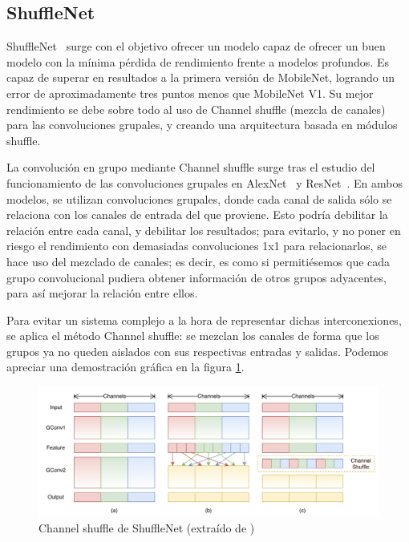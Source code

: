 \subsection{ShuffleNet}

ShuffleNet~\cite{zhang2017shufflenet,shufflenetreview} surge con el objetivo ofrecer un modelo capaz de ofrecer un buen modelo con la mínima pérdida de rendimiento frente a modelos profundos. Es capaz de superar en resultados a la primera versión de MobileNet, logrando un error de aproximadamente tres puntos menos que MobileNet V1. Su mejor rendimiento se debe sobre todo al uso de Channel shuffle (mezcla de canales) para las convoluciones grupales, y creando una arquitectura basada en módulos shuffle.

La convolución en grupo mediante Channel shuffle surge tras el estudio del funcionamiento de las convoluciones grupales en 	AlexNet~\cite{NIPS2012_c399862d} y ResNet~\cite{he2015deep}. En ambos modelos, se utilizan convoluciones grupales, donde cada canal de salida sólo se relaciona con los canales de entrada del que proviene. Esto podría debilitar la relación entre cada canal, y debilitar los resultados; para evitarlo, y no poner en riesgo el rendimiento con demasiadas convoluciones 1x1 para relacionarlos, se hace uso del mezclado de canales; es decir, es como si permitiésemos que cada grupo convolucional pudiera obtener información de otros grupos adyacentes, para así mejorar la relación entre ellos.

Para evitar un sistema complejo a la hora de representar dichas interconexiones, se aplica el método Channel shuffle: se mezclan los canales de forma que los grupos ya no queden aislados con sus respectivas entradas y salidas. Podemos apreciar una demostración gráfica en la figura \ref{shufflechannels}.

    \begin{figure}[H]

	\centering
	\includegraphics[scale = 0.2]{imagenes/shufflechannels.png}
	\caption{Channel shuffle de ShuffleNet (extraído de \cite{zhang2017shufflenet})}
	\label{shufflechannels}
\end{figure}

